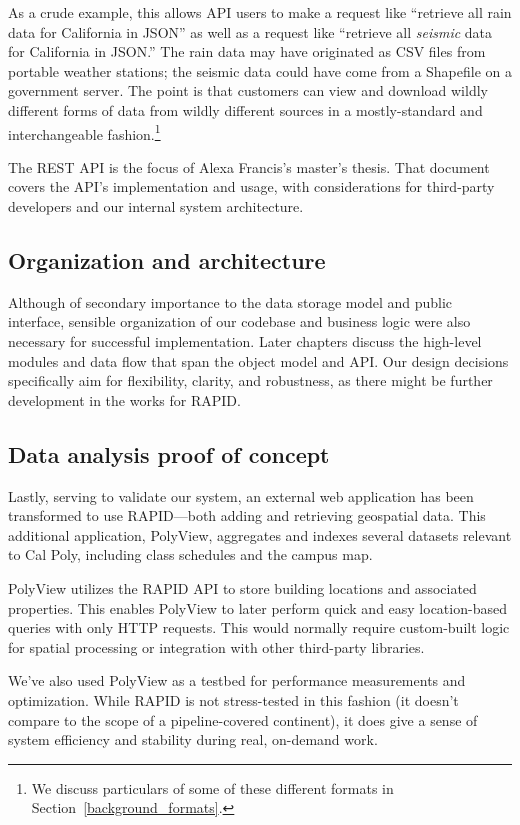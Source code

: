 As a crude example, this allows API users to make a request like ``retrieve all rain data for California in JSON'' as well as a request like ``retrieve all \textit{seismic} data for California in JSON.'' The rain data may have originated as CSV files from portable weather stations; the seismic data could have come from a Shapefile on a government server. The point is that customers can view and download wildly different forms of data from wildly different sources in a mostly-standard and interchangeable fashion.\footnote{We discuss particulars of some of these different formats in Section~\ref{background_formats}.}

The REST API is the focus of Alexa Francis's master's thesis. That document covers the API's implementation and usage, with considerations for third-party developers and our internal system architecture.

\subsection{Organization and architecture}
Although of secondary importance to the data storage model and public interface, sensible organization of our codebase and business logic were also necessary for successful implementation. Later chapters discuss the high-level modules and data flow that span the object model and API. Our design decisions specifically aim for flexibility, clarity, and robustness, as there might be further development in the works for RAPID.

\subsection{Data analysis proof of concept}
\label{polyview_intro}
Lastly, serving to validate our system, an external web application has been transformed to use RAPID---both adding and retrieving geospatial data. This additional application, PolyView, aggregates and indexes several datasets relevant to Cal Poly, including class schedules and the campus map.

PolyView utilizes the RAPID API to store building locations and associated properties. This enables PolyView to later perform quick and easy location-based queries with only HTTP requests. This would normally require custom-built logic for spatial processing or integration with other third-party libraries.

We've also used PolyView as a testbed for performance measurements and optimization. While RAPID is not stress-tested in this fashion (it doesn't compare to the scope of a pipeline-covered continent), it does give a sense of system efficiency and stability during real, on-demand work.

